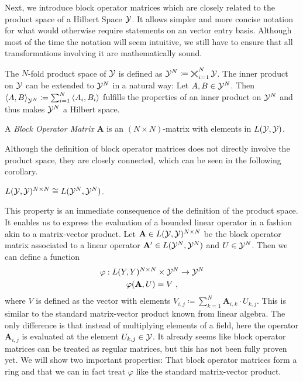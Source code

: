 Next, we introduce block operator matrices which are closely related to the product space of a Hilbert Space $\mathcal{Y}$.
It allows simpler and more concise notation for what would otherwise require statements on an vector entry basis.
Although most of the time the notation will seem intuitive, we still have to ensure that all transformations involving it are mathematically sound.

The $N$-fold product space of $\mathcal{Y}$ is defined as $\mathcal{Y}^N \coloneqq \bigtimes_{i=1}^N \mathcal{Y}$.
The inner product on $\mathcal{Y}$ can be extended to $\mathcal{Y}^N$ in a natural way:
Let $A, B \in \mathcal{Y}^N$.
Then $\left < A, B \right >_{\mathcal{Y}^N} \coloneqq \sum_{i=1}^{N} \left <A_i, B_i \right >$ fulfills the properties of an inner product on $\mathcal{Y}^N$ and thus makes $\mathcal{Y}^N$ a Hilbert space.

\begin{definition}
	A \emph{Block Operator Matrix} $\mathbf{A}$ is an $(N \times N)$-matrix with elements in $L(\mathcal{Y}, \mathcal{Y})$.
\end{definition}
Although the definition of block operator matrices does not directly involve the product space, they are closely connected, which can be seen in the following corollary.
\begin{corollary}
  $L(\mathcal{Y}, \mathcal{Y})^{N \times N} \cong L(\mathcal{Y}^N, \mathcal{Y}^N)$.
\end{corollary}
This property is an immediate consequence of the definition of the product space.
It enables us to express the evaluation of a bounded linear operator in a fashion akin to a matrix-vector product.
Let $\mathbf{A} \in L(\mathcal{Y}, \mathcal{Y})^{N\times N}$ be the block operator matrix associated to a linear operator $\mathbf{A}^\prime \in L(\mathcal{Y}^N, \mathcal{Y}^N)$ and $U \in \mathcal{Y}^N$.
Then we can define a function
\begin{gather}
	\varphi: L(Y, Y)^{N\times N} \times \mathcal{Y}^N \rightarrow \mathcal{Y}^N \\
	\varphi(\mathbf{A}, U) = V \ ,
\end{gather}
where $V$ is defined as the vector with elements $V_{i, j} \coloneqq \sum_{k = 1}^N \mathbf{A}_{i,k} \cdot U_{k, j}$.
This is similar to the standard matrix-vector product known from linear algebra.
The only difference is that instead of multiplying elements of a field, here the operator $\mathbf{A}_{i, j}$ is evaluated at the element $U_{k, j} \in \mathcal{Y}$.
It already seems like block operator matrices can be treated as regular matrices, but this has not been fully proven yet.
We will show two important properties: That block operator matrices form a ring and that we can in fact treat $\varphi$ like the standard matrix-vector product.

